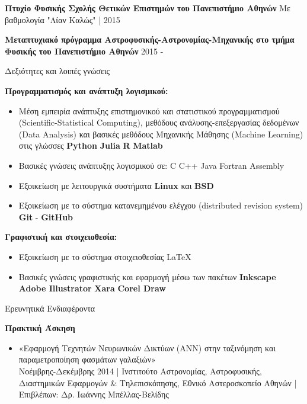\documentclass[a4paper,12pt,final]{memoir}
\newcommand{\SmallSep}{\vspace{0.25em}}
\newcommand{\CVSection}[1]
	{\Large{#1}\par
	\SmallSep\normalsize\normalfont}
\newcommand{\CVItem}[2]
	{\textbf{\color{RoyalBlue} #1} #2}
\newcommand{\location}[1]{ %
\small{\color{headings}#1}}
\newenvironment{tightitemize} %
{\vspace{-\topsep}\begin{itemize}\itemsep1pt \parskip0pt \parsep0pt}
{\end{itemize}\vspace{-\topsep}}
\begin{document}
\CVItem{Πτυχίο Φυσικής Σχολής Θετικών Επιστημών του Πανεπιστήμιο Αθηνών}{\newline}
\location{Με βαθμολογία "Λίαν Καλώς" | 2015}
\SmallSep

\CVItem{Μεταπτυχιακό πρόγραμμα Αστροφυσικής-Αστρονομίας-Μηχανικής στο τμήμα Φυσικής του Πανεπιστήμιο Αθηνών }{\newline}
\location{2015 -}
\SmallSep



\CVSection{Δεξιότητες και λοιπές γνώσεις}
\CVItem{Προγραμματισμός και ανάπτυξη λογισμικού:}{}
\begin{tightitemize}
\item Μέση εμπειρία ανάπτυξης επιστημονικού και στατιστικού προγραμματισμού (Scientific-Statistical Computing), μεθόδους ανάλυσης-επεξεργασίας δεδομένων (Data Analysis) και βασικές μεθόδους Μηχανικής Μάθησης (Machine Learning) στις γλώσσες \textbf{Python} \textbullet{} \textbf{Julia} \textbullet{} \textbf{R} \textbullet{} \textbf{Matlab}
\item Βασικές γνώσεις ανάπτυξης λογισμικού σε: C \textbullet{} C++ \textbullet{} Java \textbullet{} Fortran \textbullet{} Assembly 
\item Εξοικείωση με λειτουργικά συστήματα \textbf{Linux} και \textbf{BSD}
\item Εξοικείωση με το σύστημα κατανεμημένου ελέγχου (distributed revision system) \textbf{Git} - \textbf{GitHub}
\end{tightitemize}

\CVItem{Γραφιστική και στοιχειοθεσία:}{}
\begin{tightitemize}
\item Εξοικείωση με το σύστημα στοιχειοθεσίας \LaTeX\
\item Βασικές γνώσεις γραφιστικής και εφαρμογή μέσω των πακέτων \textbf{Inkscape} \textbullet{} \textbf{Adobe Illustrator} \textbullet{} \textbf{Xara} \textbullet{} \textbf{Corel Draw}
\end{tightitemize}
\SmallSep

\CVSection{Ερευνητικά Ενδιαφέροντα}
\CVItem{Πρακτική Άσκηση}{}
\begin{tightitemize}
	\item «Εφαρμογή Τεχνητών Νευρωνικών Δικτύων (ANN) στην ταξινόμηση και παραμετροποίηση φασμάτων γαλαξιών» \\
	\location{Νοέμβρης-Δεκέμβρης 2014 | Ινστιτούτο Αστρονομίας, Αστροφυσικής, Διαστημικών Εφαρμογών \& Τηλεπισκόπησης, Εθνικό Αστεροσκοπείο Αθηνών | Επιβλέπων: Δρ. Ιωάννης Μπέλλας-Βελίδης}
\end{tightitemize}
\end{document}
